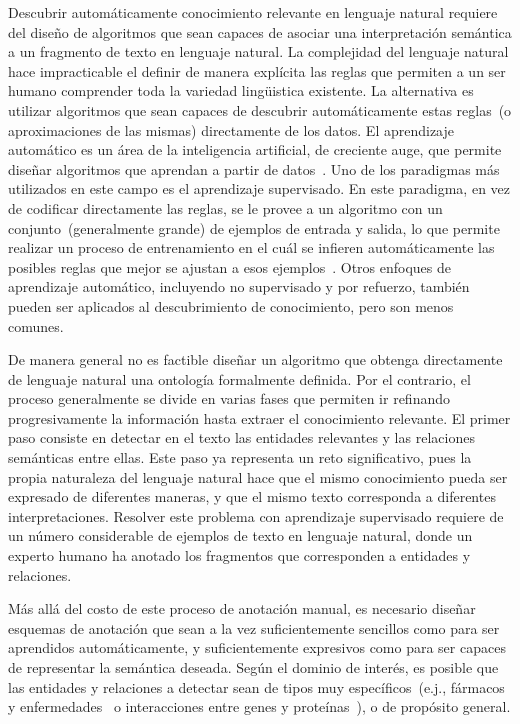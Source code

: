 Descubrir automáticamente conocimiento relevante en lenguaje natural requiere del diseño de algoritmos que sean capaces de asociar una interpretación semántica a un fragmento de texto en lenguaje natural.
La complejidad del lenguaje natural hace impracticable el definir de manera explícita las reglas que permiten a un ser humano comprender toda la variedad lingüistica existente.
La alternativa es utilizar algoritmos que sean capaces de descubrir automáticamente estas reglas~(o aproximaciones de las mismas) directamente de los datos.
El aprendizaje automático es un área de la inteligencia artificial, de creciente auge, que permite diseñar algoritmos que aprendan a partir de datos~\cite{mitchell1997machine}.
Uno de los paradigmas más utilizados en este campo es el aprendizaje supervisado.
En este paradigma, en vez de codificar directamente las reglas, se le provee a un algoritmo con un conjunto~(generalmente grande) de ejemplos de entrada y salida, lo que permite realizar un proceso de entrenamiento en el cuál se infieren automáticamente las posibles reglas que mejor se ajustan a esos ejemplos~\cite{murphy2012machine}.
Otros enfoques de aprendizaje automático, incluyendo no supervisado y por refuerzo, también pueden ser aplicados al descubrimiento de conocimiento, pero son menos comunes.

De manera general no es factible diseñar un algoritmo que obtenga directamente de lenguaje natural una ontología formalmente definida.
Por el contrario, el proceso generalmente se divide en varias fases que permiten ir refinando progresivamente la información hasta extraer el conocimiento relevante.
El primer paso consiste en detectar en el texto las entidades relevantes y las relaciones semánticas entre ellas.
Este paso ya representa un reto significativo, pues la propia naturaleza del lenguaje natural hace que el mismo conocimiento pueda ser expresado de diferentes maneras, y que el mismo texto corresponda a diferentes interpretaciones.
Resolver este problema con aprendizaje supervisado requiere de un número considerable de ejemplos de texto en lenguaje natural, donde un experto humano ha anotado los fragmentos que corresponden a entidades y relaciones.

Más allá del costo de este proceso de anotación manual, es necesario diseñar esquemas de anotación que sean a la vez suficientemente sencillos como para ser aprendidos automáticamente, y suficientemente expresivos como para ser capaces de representar la semántica deseada.
Según el dominio de interés, es posible que las entidades y relaciones a detectar sean de tipos muy específicos~(e.j., fármacos y enfermedades~\cite{goldberg1996drug} o interacciones entre genes y proteínas~\cite{tanabe2005genetag}), o de propósito general.

